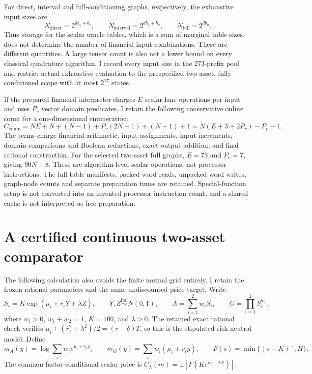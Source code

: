 For direct, interval and full-conditioning graphs, respectively, the exhaustive
input sizes are
\[
 N_{\mathrm{direct}}=2^{d b_y+b_z},\qquad
 N_{\mathrm{interval}}=2^{d b_y+b_u},\qquad
 N_{\mathrm{full}}=2^{d b_y}.
\]
Thus storage for the scalar oracle tables, which is a sum of marginal table
sizes, does not determine the number of financial input combinations. These are
different quantities. A large tensor count is also not a lower bound on every
classical quadrature algorithm. I record every input size in the 273-prefix pool
and restrict actual exhaustive evaluation to the prespecified two-asset,
fully conditioned scope with at most \(2^{17}\) states.

If the prepared financial interpreter charges \(E\) scalar-lane operations per
input and uses \(P_v\) vector domain predicates, I retain the following
conservative online count for a one-dimensional enumeration:
\[
 C_{\mathrm{enum}}=NE+N+(N-1)+P_v(2N-1)+(N-1)+1
                =N(E+3+2P_v)-P_v-1.
\]
The terms charge financial arithmetic, input assignments, input increments,
domain comparisons and Boolean reductions, exact output addition, and final
rational construction. For the selected two-asset full graphs,
\(E=73\) and \(P_v=7\), giving \(90N-8\). These are algorithm-level scalar
operations, not processor instructions. The full table manifests, packed-word
reads, unpacked-word writes, graph-node counts and separate preparation times
are retained. Special-function setup is not converted into an invented processor
instruction count, and a shared cache is not interpreted as free preparation.

\section{A certified continuous two-asset comparator}

The following calculation also avoids the finite normal grid entirely. I retain
the frozen rational parameters and the same undiscounted price target. Write
\[
 S_i=K\exp(\mu_i+r_iY+\lambda Z),\qquad
 Y,Z\stackrel{\mathrm{ind}}{\sim}N(0,1),\qquad
 A=\sum_{i=1}^{2}w_iS_i,\qquad G=\prod_{i=1}^{2}S_i^{w_i},
\]
where \(w_i>0\), \(w_1+w_2=1\), \(K=100\), and \(\lambda>0\).
The retained exact rational check verifies
\(\mu_i+(r_i^2+\lambda^2)/2=(r-\delta)T\), so this is the stipulated
risk-neutral model. Define
\[
 m_A(y)=\log\sum_iw_i e^{\mu_i+r_iy},\qquad
 m_G(y)=\sum_iw_i(\mu_i+r_iy),\qquad
 F(s)=\min\{(s-K)^+,H\}.
\]
The common-factor conditional scalar price is
\(C_\lambda(m)=\mathbb E[F(K e^{m+\lambda Z})]\).

